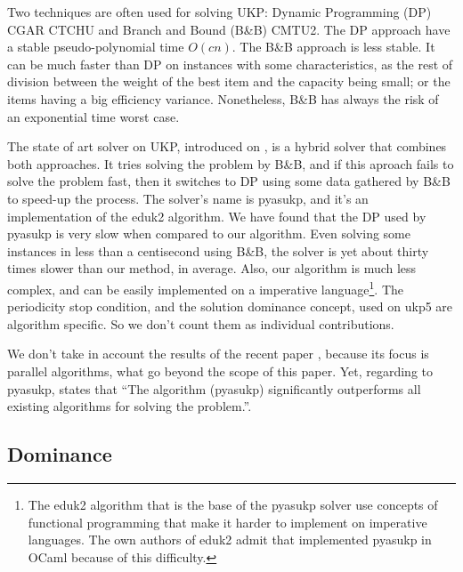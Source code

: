 \documentclass[runningheads,a4paper]{llncs}
\begin{document}
Two techniques are often used for solving UKP: Dynamic Programming (DP) \cite{CGAR} CGAR CTCHU and Branch and Bound (B\&B) CMTU2. The DP approach have a stable pseudo-polynomial time \(O(c n)\). The B\&B approach is less stable. It can be much faster than DP on instances with some characteristics, as the rest of division between the weight of the best item and the capacity being small; or the items having a big efficiency variance. Nonetheless, B\&B has always the risk of an exponential time worst case.

The state of art solver on UKP, introduced on \cite{CPYA}, is a hybrid solver that combines both approaches. It tries solving the problem by B\&B, and if this aproach fails to solve the problem fast, then it switches to DP using some data gathered by B\&B to speed-up the process. The solver's name is pyasukp, and it's an implementation of the eduk2 algorithm. We have found that the DP used by pyasukp is very slow when compared to our algorithm. Even solving some instances in less than a centisecond using B\&B, the solver is yet about thirty times slower than our method, in average. Also, our algorithm is much less complex, and can be easily implemented on a imperative language\footnote{The eduk2 algorithm that is the base of the pyasukp solver use concepts of functional programming that make it harder to implement on imperative languages. The own authors of eduk2 admit that implemented pyasukp in OCaml because of this difficulty.}. The periodicity stop condition, and the solution dominance concept, used on ukp5 are algorithm specific. So we don't count them as individual contributions.

We don't take in account the results of the recent paper \cite{CMUL}, because its focus is parallel algorithms, what go beyond the scope of this paper. Yet, regarding to pyasukp, \cite{CMUL} states that ``The algorithm (pyasukp) significantly outperforms all existing algorithms for solving the problem.''.


\subsection{Dominance}
\end{document}
